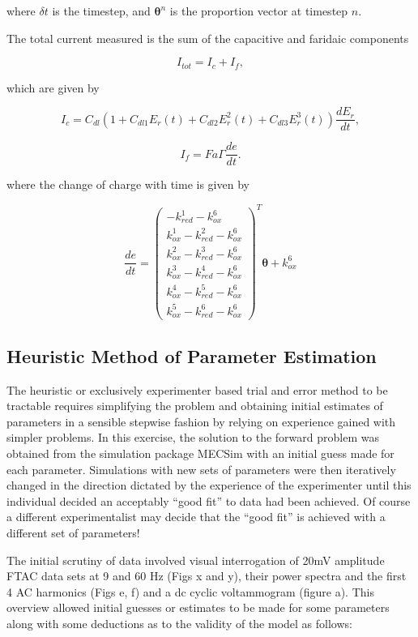 \documentclass[a4paper, 12pt]{article}
\begin{document}
where $\delta t$ is the timestep, and $\bm{\theta}^n$ is the proportion vector 
at timestep $n$.


The total current measured is the sum of the capacitive and faridaic components

$$
I_{tot} = I_c + I_f,
$$

which are given by

$$
I_c = C_{dl} \left(1 + C_{dl1} E_r(t) + C_{dl2} E_r^2(t) + C_{dl3} 
E_r^3(t)\right) \frac{dE_r}{dt},
$$

$$
I_f = F a \Gamma \frac{de}{dt}.
$$

where the change of charge with time is given by

$$
\frac{de}{dt} = 
\begin{pmatrix}
    -k^1_{red}-k^6_{ox} \\
    k^1_{ox}-k^2_{red}-k^6_{ox} \\
    k^2_{ox}-k^3_{red}-k^6_{ox} \\
    k^3_{ox}-k^4_{red}-k^6_{ox} \\
    k^4_{ox}-k^5_{red}-k^6_{ox} \\
    k^5_{ox}-k^6_{red}-k^6_{ox}
\end{pmatrix}^T \bm{\theta} +  k^6_{ox} 
$$


\subsection{Heuristic Method of Parameter Estimation}

The heuristic or exclusively experimenter based trial and error method to be 
tractable requires simplifying the problem and obtaining initial estimates of 
parameters in a sensible stepwise fashion by relying on experience gained with 
simpler problems. In this exercise, the solution to the forward problem was 
obtained from the simulation package MECSim with an initial guess made for each 
parameter. Simulations with new sets of parameters were then iteratively changed 
in the direction dictated by the experience of the experimenter until this 
individual decided an acceptably “good fit” to data had been achieved. Of course 
a different experimentalist may decide that the “good fit” is achieved with a 
different set of parameters!

The initial scrutiny of data involved visual interrogation of   20mV amplitude 
FTAC data sets at 9 and 60 Hz (Figs x and y), their power spectra and the first 
4 AC harmonics (Figs e, f) and a dc cyclic voltammogram (figure a). This 
overview allowed initial guesses or estimates to be made for some parameters 
along with some deductions as to the validity of the model as follows:
\end{document}
